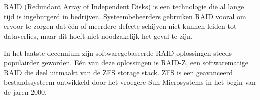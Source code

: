 




\chapter*{}


RAID (Redundant Array of Independent Disks) is een technologie die al lange tijd is ingeburgerd in bedrijven. Systeembeheerders gebruiken RAID vooral om ervoor te zorgen dat één of meerdere defecte schijven niet kunnen leiden tot dataverlies, maar dit hoeft niet noodzakelijk het geval te zijn. 

In het laatste decennium zijn softwaregebaseerde RAID-oplossingen steeds populairder geworden. Eén van deze oplossingen is RAID-Z, een softwarematige RAID die deel uitmaakt van de ZFS storage stack. ZFS is een geavanceerd bestandssysteem ontwikkeld door het vroegere Sun Microsystems in het begin van de jaren 2000. 

